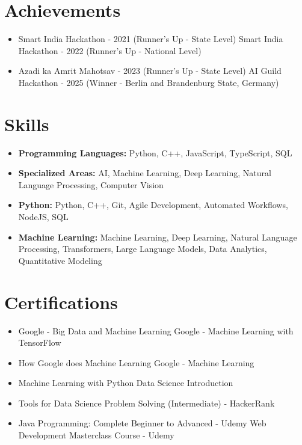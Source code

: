 \documentclass[a4paper,10pt]{article}
\begin{document}
\section*{Achievements}
\begin{itemize}
\item Smart India Hackathon - 2021 (Runner's Up - State Level) \hfill Smart India Hackathon - 2022 (Runner's Up - National Level)
\item Azadi ka Amrit Mahotsav - 2023 (Runner's Up - State Level) \hfill AI Guild Hackathon - 2025 (Winner - Berlin and Brandenburg State, Germany)
\end{itemize}

\section*{Skills}
\begin{itemize}
  \item \textbf{Programming Languages:} Python, C++, JavaScript, TypeScript, SQL
  \item \textbf{Specialized Areas:} AI, Machine Learning, Deep Learning, Natural Language Processing, Computer Vision
  \item \textbf{Python:} Python, C++, Git, Agile Development, Automated Workflows, NodeJS, SQL
  \item \textbf{Machine Learning:} Machine Learning, Deep Learning, Natural Language Processing, Transformers, Large Language Models, Data Analytics, Quantitative Modeling
\end{itemize}

\section*{Certifications}
\begin{itemize}
\item Google - Big Data and Machine Learning \hfill Google - Machine Learning with TensorFlow
\item How Google does Machine Learning \hfill Google - Machine Learning
\item Machine Learning with Python \hfill Data Science Introduction
\item Tools for Data Science \hfill Problem Solving (Intermediate) - HackerRank
\item Java Programming: Complete Beginner to Advanced - Udemy \hfill Web Development Masterclass Course - Udemy
\end{itemize}
\end{document}
